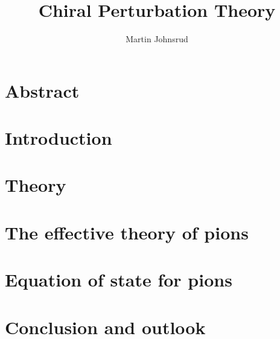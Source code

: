 \documentclass{book}
\title{Chiral Perturbation Theory}
\author{Martin Johnsrud}
\begin{document}
\maketitle 

\tableofcontents

\chapter*{Abstract}


\chapter{Introduction}



\chapter{Theory}






\chapter{The effective theory of pions}
\label{serction:effective_pion_lagrangian}








\chapter{Equation of state for pions}




\chapter{Conclusion and outlook}

\end{document}
